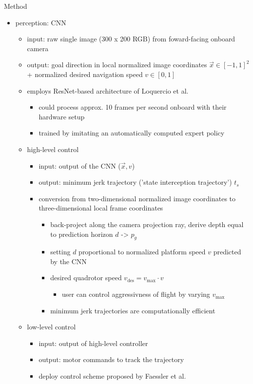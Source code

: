 Method
\begin{itemize}
    \item perception: CNN
    \begin{itemize}
        \item input: raw single image (300 x 200 RGB) from foward-facing onboard camera 
        \item output: goal direction in local normalized image coordinates $\vec x \in [-1, 1]^2$ + normalized desired navigation speed $v\in [0, 1]$
        \item employs ResNet-based architecture of Loquercio et al.
        \begin{itemize}
            \item could process approx. 10 frames per second onboard with their hardware setup
            \item trained by imitating an automatically computed expert policy
        \end{itemize}
    \item high-level control
    \begin{itemize}
        \item input: output of the CNN ($\vec x, v$)
        \item output: minimum jerk trajectory ('state interception trajectory') $t_s$
        \item conversion from two-dimensional normalized image coordinates to three-dimensional local frame coordinates
        \begin{itemize}
            \item back-project along the camera projection ray, derive depth equal to prediction horizon $d$ -> $p_g$
            \item setting $d$ proportional to normalized platform speed $v$ predicted by the CNN
            \item desired quadrotor speed $v_\text{des} = v_\text{max} \cdot v$
            \begin{itemize}
                \item user can control aggressivness of flight by varying $v_\text{max}$
            \end{itemize}
            \item minimum jerk trajectories are computationally efficient
        \end{itemize}
    \end{itemize}
    \item low-level control
    \begin{itemize}
        \item input: output of high-level controller
        \item output: motor commands to track the trajectory
        \item deploy control scheme proposed by Faessler et al.
    \end{itemize}
    \end{itemize} 
\end{itemize}

